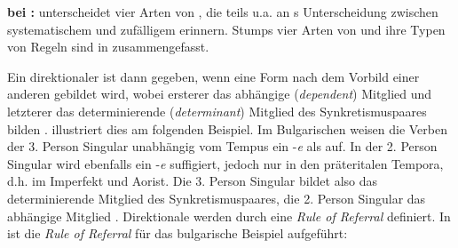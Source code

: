 \begin{exe}
\begin{exe}
\noindent
\textbf{ bei \citet{Stump2001}:} \citet{Stump2001} unterscheidet vier Arten von , die teils u.a. an \citeauthor{Zwicky1985}s \citeyearpar{Zwicky1985} Unterscheidung zwischen systematischem und zufälligem  erinnern. Stumps vier Arten von  und ihre Typen von Regeln sind in  zusammengefasst.


\begin{table}
\caption{Typen von Synkretismen basierend auf \citet[212–217]{Stump2001}}\label{table4.7}
\end{table}

Ein direktionaler  ist dann gegeben, wenn eine Form nach dem Vorbild einer anderen gebildet wird, wobei ersterer das abhängige (\textit{dependent}) Mitglied und letzterer das determinierende (\textit{determinant}) Mitglied des Synkretismuspaares bilden \citep[213]{Stump2001}. \citet{Stump2001} illustriert dies am folgenden Beispiel. Im Bulgarischen weisen die Verben der 3. Person Singular unabhängig vom Tempus ein -\textit{e} als  auf. In der 2. Person Singular wird ebenfalls ein -\textit{e} suffigiert, jedoch nur in den präteritalen Tempora, d.h. im Imperfekt und Aorist. Die 3. Person Singular bildet also das determinierende Mitglied des Synkretismuspaares, die 2. Person Singular das abhängige Mitglied \citep[212–213]{Stump2001}. Direktionale  werden durch eine \textit{Rule of Referral} definiert. In  ist die \textit{Rule of Referral} für das bulgarische Beispiel aufgeführt:


\end{exe}
\end{exe}
